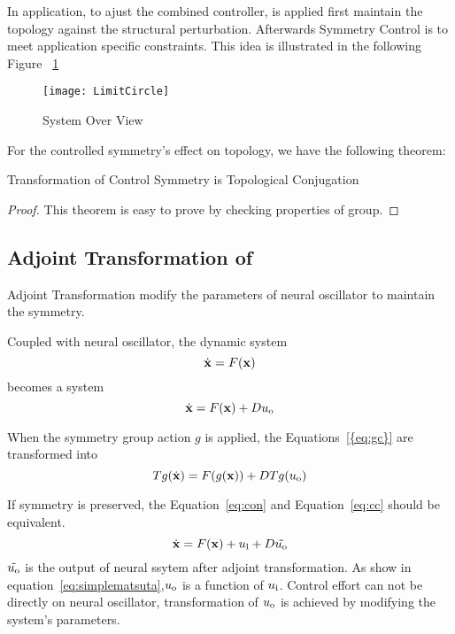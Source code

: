 In application, to ajust the combined controller,
\cpg is applied first maintain the topology against the structural perturbation. 
Afterwards Symmetry Control is to meet application specific constraints.
This idea is illustrated in the following Figure ~\ref{fig:sysoverview}

\begin{figure}[!htbp]
  \begin{center}
      \texttt{[image: LimitCircle]}
    \caption{System Over View }
    \label{fig:sysoverview}
  \end{center}
\end{figure}


For the controlled symmetry's effect on topology, we have the following theorem:

\begin{mythe}
Transformation of Control Symmetry is Topological Conjugation
\end{mythe}
\begin{proof}
This theorem is easy to prove by checking properties of group.
\end{proof}

\subsection{Adjoint Transformation of \cpg}
Adjoint Transformation modify the parameters of neural oscillator to maintain the symmetry.

Coupled with neural oscillator, the dynamic system 
\[
\dot{\mathbf{x}}=F(\mathbf{x})
\]
becomes a system 
\begin{equation}
\label{eq:gc}
\dot{\mathbf{x}}=F(\mathbf{x})+Du_{\mathrm{o}}
\end{equation}


When the symmetry group action $g$ is applied, the Equations~\ref{{eq:gc}} are transformed into
\begin{equation}
\label{eq:cc}
Tg(\dot{\mathbf{x}})=F(g(\mathbf{x}))+DTg(u_{\mathrm{o}})
\end{equation}




If symmetry is preserved, the Equation~\ref{eq:con} and Equation~\ref{eq:cc} should be equivalent.
\begin{equation}
\label{eq:con}
\dot{\mathbf{x}}=F(\mathbf{x})+u_{\mathrm{l}}+D\tilde{u_{\mathrm{o}}}
\end{equation}
$\tilde{u_{\mathrm{o}}}$ is the output of neural ssytem after adjoint transformation.
As show in equation~\ref{eq:simplematsuta},$u_{\mathrm{o}}$ is a function of $u_{\mathrm{i}}$.
Control effort can not be directly on neural oscillator, transformation of $u_{\mathrm{o}}$ is achieved by modifying the system's parameters.



